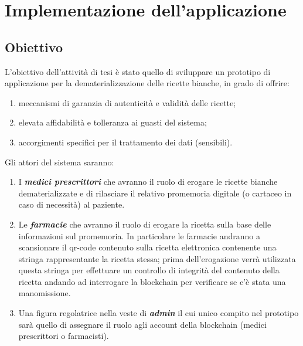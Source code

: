 %
%
\chapter{Implementazione dell'applicazione}
%
\label{cap:implementazione}
%
\section{Obiettivo}
%
L’obiettivo dell’attività di tesi è stato quello di sviluppare un prototipo di applicazione per la dematerializzazione delle ricette bianche, in grado di offrire:
\begin{enumerate}
	\item meccanismi di garanzia di autenticità e validità delle ricette;
	\item elevata affidabilità e tolleranza ai guasti del sistema; 
	\item accorgimenti specifici per il trattamento dei dati (sensibili).
\end{enumerate}
Gli attori del sistema saranno:
\begin{enumerate}
	\item I \textit{\textbf{medici prescrittori}} che avranno il ruolo di erogare le ricette bianche dematerializzate e di rilasciare il relativo promemoria digitale (o cartaceo in caso di necessità) al paziente.
	\item Le \textit{\textbf{farmacie}} che avranno il ruolo di erogare la ricetta sulla base delle informazioni sul promemoria. In particolare le farmacie andranno a scansionare il qr-code contenuto sulla ricetta elettronica contenente una stringa rappresentante la ricetta stessa; prima dell'erogazione verrà utilizzata questa stringa per effettuare un controllo di integrità del contenuto della ricetta andando ad interrogare la blockchain per verificare se c'è stata una manomissione.
	\item Una figura regolatrice nella veste di \textit{\textbf{admin}} il cui unico compito nel prototipo sarà quello di assegnare il ruolo agli account della blockchain (medici prescrittori o farmacisti).
\end{enumerate}
